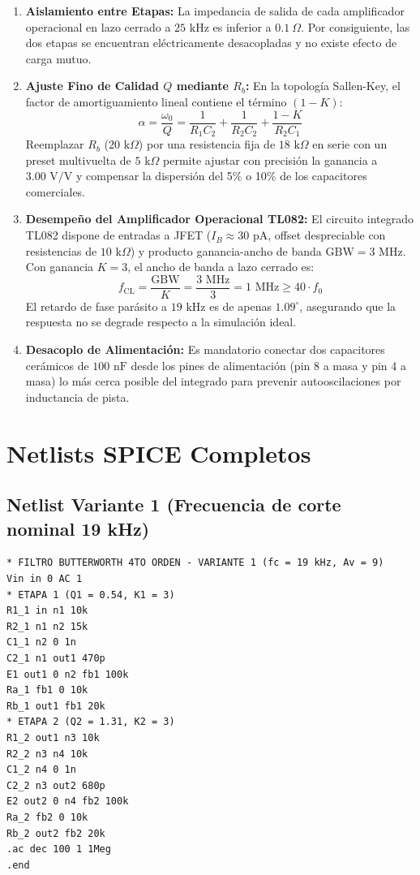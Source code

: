 \documentclass[a4paper,11pt]{article}
\begin{document}
\begin{enumerate}
    \item \textbf{Aislamiento entre Etapas:} La impedancia de salida de cada amplificador operacional en lazo cerrado a $25\text{ kHz}$ es inferior a $0.1\ \Omega$. Por consiguiente, las dos etapas se encuentran eléctricamente desacopladas y no existe efecto de carga mutuo.
    \item \textbf{Ajuste Fino de Calidad $Q$ mediante $R_b$:} En la topología Sallen-Key, el factor de amortiguamiento lineal contiene el término $(1 - K)$:
    \begin{equation}
    \alpha = \frac{\omega_0}{Q} = \frac{1}{R_1 C_2} + \frac{1}{R_2 C_2} + \frac{1 - K}{R_2 C_1}
    \end{equation}
    Reemplazar $R_b$ ($20\text{ k}\Omega$) por una resistencia fija de $18\text{ k}\Omega$ en serie con un preset multivuelta de $5\text{ k}\Omega$ permite ajustar con precisión la ganancia a $3.00\text{ V/V}$ y compensar la dispersión del 5\% o 10\% de los capacitores comerciales.
    \item \textbf{Desempeño del Amplificador Operacional TL082:}
    El circuito integrado TL082 dispone de entradas a JFET ($I_B \approx 30\text{ pA}$, offset despreciable con resistencias de $10\text{ k}\Omega$) y producto ganancia-ancho de banda $\text{GBW} = 3\text{ MHz}$. Con ganancia $K = 3$, el ancho de banda a lazo cerrado es:
    \begin{equation}
    f_{\text{CL}} = \frac{\text{GBW}}{K} = \frac{3\text{ MHz}}{3} = 1\text{ MHz} \ge 40 \cdot f_0
    \end{equation}
    El retardo de fase parásito a $19\text{ kHz}$ es de apenas $1.09^\circ$, asegurando que la respuesta no se degrade respecto a la simulación ideal.
    \item \textbf{Desacoplo de Alimentación:} Es mandatorio conectar dos capacitores cerámicos de $100\text{ nF}$ desde los pines de alimentación (pin 8 a masa y pin 4 a masa) lo más cerca posible del integrado para prevenir autooscilaciones por inductancia de pista.
\end{enumerate}

\section{Netlists SPICE Completos}

\subsection{Netlist Variante 1 (Frecuencia de corte nominal 19 kHz)}
\begin{lstlisting}
* FILTRO BUTTERWORTH 4TO ORDEN - VARIANTE 1 (fc = 19 kHz, Av = 9)
Vin in 0 AC 1
* ETAPA 1 (Q1 = 0.54, K1 = 3)
R1_1 in n1 10k
R2_1 n1 n2 15k
C1_1 n2 0 1n
C2_1 n1 out1 470p
E1 out1 0 n2 fb1 100k
Ra_1 fb1 0 10k
Rb_1 out1 fb1 20k
* ETAPA 2 (Q2 = 1.31, K2 = 3)
R1_2 out1 n3 10k
R2_2 n3 n4 10k
C1_2 n4 0 1n
C2_2 n3 out2 680p
E2 out2 0 n4 fb2 100k
Ra_2 fb2 0 10k
Rb_2 out2 fb2 20k
.ac dec 100 1 1Meg
.end
\end{lstlisting}
\end{document}
